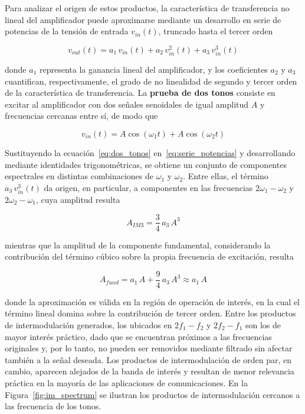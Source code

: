 Para analizar el origen de estos productos, la característica de transferencia no lineal del amplificador puede aproximarse mediante un desarrollo en serie de potencias de la tensión de entrada $v_{in}(t)$, truncado hasta el tercer orden \cite[pp.~233--240]{cripps2006}

\begin{equation}
    v_{out}(t) = a_1\,v_{in}(t) + a_2\,v_{in}^2(t) + a_3\,v_{in}^3(t)
    \label{eq:serie_potencias}
\end{equation}

donde $a_1$ representa la ganancia lineal del amplificador, y los coeficientes $a_2$ y $a_3$ cuantifican, respectivamente, el grado de no linealidad de segundo y tercer orden de la característica de transferencia. La \textbf{prueba de dos tonos} consiste en excitar al amplificador con dos señales senoidales de igual amplitud $A$ y frecuencias cercanas entre sí, de modo que

\begin{equation}
    v_{in}(t) = A\cos(\omega_1 t) + A\cos(\omega_2 t)
    \label{eq:dos_tonos}
\end{equation}

Sustituyendo la ecuación~\eqref{eq:dos_tonos} en~\eqref{eq:serie_potencias} y desarrollando mediante identidades trigonométricas, se obtiene un conjunto de componentes espectrales en distintas combinaciones de $\omega_1$ y $\omega_2$. Entre ellas, el término $a_3\,v_{in}^3(t)$ da origen, en particular, a componentes en las frecuencias $2\omega_1 - \omega_2$ y $2\omega_2 - \omega_1$, cuya amplitud resulta

\begin{equation}
    A_{IM3} = \frac{3}{4}\,a_3\,A^3
    \label{eq:amplitud_im3}
\end{equation}

mientras que la amplitud de la componente fundamental, considerando la contribución del término cúbico sobre la propia frecuencia de excitación, resulta

\begin{equation}
    A_{fund} = a_1\,A + \frac{9}{4}\,a_3\,A^3 \approx a_1\,A
    \label{eq:amplitud_fund}
\end{equation}

donde la aproximación es válida en la región de operación de interés, en la cual el término lineal domina sobre la contribución de tercer orden. Entre los productos de intermodulación generados, los ubicados en $2f_1 - f_2$ y $2f_2 - f_1$ son los de mayor interés práctico, dado que se encuentran próximos a las frecuencias originales y, por lo tanto, no pueden ser removidos mediante filtrado sin afectar también a la señal deseada. Los productos de intermodulación de orden par, en cambio, aparecen alejados de la banda de interés y resultan de menor relevancia práctica en la mayoría de las aplicaciones de comunicaciones. En la Figura~\ref{fig:im_spectrum} se ilustran los productos de intermodulación cercanos a las frecuencia de los tonos.

